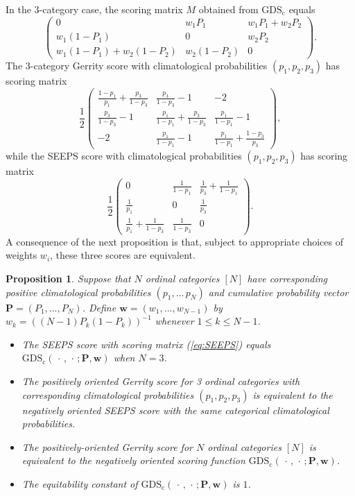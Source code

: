 \documentclass[10pt]{article} %
\theoremstyle{theorem}
\newtheorem{prop}{Proposition}
\theoremstyle{definition}
\newcommand{\boldw}{\mathbf{w}}
\newcommand{\boldP}{\mathbf{P}}
\newcommand{\ds}{\displaystyle}
\newcommand{\GDSc}{\mathrm{GDS}_\mathrm{c}}
\begin{document}
In the 3-category case, the scoring matrix $M$ obtained from $\GDSc$ equals
\begin{equation}\label{eq:GDS scoring matrix 3-cat}
\begin{pmatrix}
0 & w_1 P_1 &  w_1 P_1+w_2 P_2 \\
w_1(1- P_1) & 0 & w_2 P_2  \\
w_1(1-P_1) + w_2(1-P_2) & w_2(1-P_2) & 0
\end{pmatrix}.
\end{equation}
The 3-category Gerrity score with climatological probabilities $(p_1,p_2,p_3)$ has scoring matrix
\begin{equation}\label{eq:Gerrity 3-cat}
\frac{1}{2}\begin{pmatrix}
\ds\frac{1-p_1}{p_1} + \frac{p_3}{1-p_3} & \ds\frac{p_3}{1-p_3}-1 & -2 \\
\ds\frac{p_3}{1-p_3} -1 & \ds\frac{p_1}{1-p_1} + \frac{p_3}{1-p_3} &  \ds\frac{p_1}{1-p_1} -1 \\
-2 & \ds\frac{p_1}{1-p_1} - 1 & \ds\frac{p_1}{1-p_1} + \ds\frac{1-p_3}{p_3}
\end{pmatrix},
\end{equation}
while the SEEPS score with climatological probabilities $(p_1,p_2,p_3)$ has scoring matrix
\begin{equation}\label{eq:SEEPS}
\frac{1}{2}\begin{pmatrix}
0 & \ds\frac{1}{1-p_1} & \ds\frac{1}{p_3}+\frac{1}{1-p_1} \\
\ds\frac{1}{p_1} & 0 &  \ds\frac{1}{p_3} \\
 \ds\frac{1}{p_1}+\frac{1}{1-p_3} & \ds\frac{1}{1-p_3} & 0
\end{pmatrix}.
\end{equation}
A consequence of the next proposition is that, subject to appropriate choices of weights $w_i$, these three scores are equivalent.

\begin{prop}\label{prop:gerrity SEEPS GDS equivalence}
Suppose that $N$ ordinal categories $[N]$ have corresponding positive climatological probabilities $(p_1,\ldots\,p_N)$ and cumulative probability vector $\boldP=(P_1,\ldots,P_N)$. Define $\boldw=(w_1,\dots,w_{N-1})$ by $w_k =  ((N-1) P_k(1-P_k))^{-1}$ whenever $1\leq k \leq N-1$.
\begin{itemize}
\item[(i)] The SEEPS score with scoring matrix (\ref{eq:SEEPS}) equals $\GDSc(\,\cdot\,,\,\cdot\,; \boldP, \boldw)$ when $N=3$.
\item[(ii)] The positively oriented Gerrity score for 3 ordinal categories with corresponding climatological probabilities $(p_1,p_2,p_3)$ is equivalent to the negatively oriented SEEPS score with the same categorical climatological probabilities.
\item[(iii)] The positively-oriented Gerrity score for $N$ ordinal categories $[N]$ is equivalent to the negatively oriented scoring function $\GDSc(\,\cdot\,,\,\cdot\,; \boldP, \boldw)$.
\item[(iv)] The equitability constant of $\GDSc(\,\cdot\,,\,\cdot\,; \boldP, \boldw)$ is $1$.
\end{itemize}
\end{prop}
\end{document}

